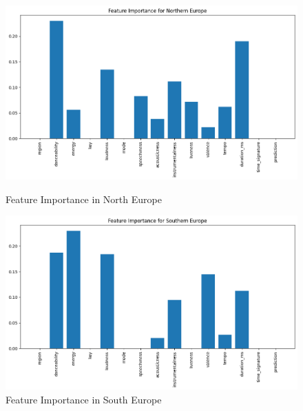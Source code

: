 \begin{figure}[h]
    \centering
    \begin{minipage}{0.45\textwidth}
        \centering
        \includegraphics[width=\linewidth]{media/dt_feat_imp_north_eu.png}
        \caption{Feature Importance in North Europe}
    \end{minipage}%
    \hspace{0.05\textwidth} %
    \begin{minipage}{0.45\textwidth}
        \centering
        \includegraphics[width=\linewidth]{media/dt_feat_imp_south_eu.png}
        \caption{Feature Importance in South Europe}
    \end{minipage}
\end{figure}

